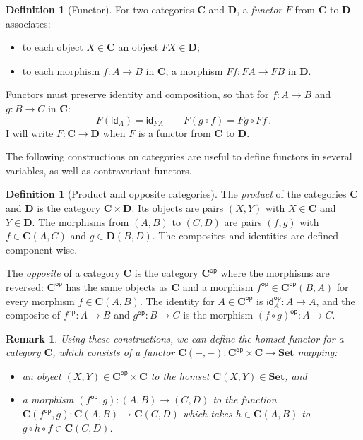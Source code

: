 \documentclass[11pt,oneside]{book}
\newtheorem{remark}[theorem]{Remark}
\theoremstyle{definition}
\newtheorem{definition}[theorem]{Definition}
\newcommand{\kw}[1]{\ensuremath{ \mathsf{#1} }}
\begin{document}
\begin{definition}[Functor] \label{def:functor} %
For two categories $\mathbf{C}$ and $\mathbf{D}$,
a \emph{functor} $F$ from $\mathbf{C}$ to $\mathbf{D}$
associates:
\begin{itemize}
  \item
    to each object $X \in \mathbf{C}$ an object $F X \in \mathbf{D}$;
  \item
    to each morphism $f : A \rightarrow B$ in $\mathbf{C}$,
    a morphism $F f : F A \rightarrow F B$ in $\mathbf{D}$.
\end{itemize}
Functors must preserve identity and composition,
so that for
$f : A \rightarrow B$ and
$g : B \rightarrow C$ in $\mathbf{C}$:
\[
  F (\kw{id}_A) = \kw{id}_{F A}
  \qquad
  F (g \circ f) = F g \circ F f
  \,.
\]
I will write $F : \mathbf{C} \rightarrow \mathbf{D}$
when $F$ is a functor from $\mathbf{C}$ to $\mathbf{D}$.
\end{definition}

The following constructions on categories
are useful to define functors in several variables,
as well as contravariant functors.

\begin{definition}[Product and opposite categories] %
  The \emph{product} of the categories $\mathbf{C}$ and $\mathbf{D}$
  is the category $\mathbf{C} \times \mathbf{D}$.
  Its objects are pairs $(X, Y)$ with $X \in \mathbf{C}$ and $Y \in \mathbf{D}$.
  The morphisms from $(A, B)$ to $(C, D)$
  are pairs $(f, g)$ with $f \in \mathbf{C}(A, C)$ and $g \in \mathbf{D}(B, D)$.
  The composites and identities are defined component-wise.

  The \emph{opposite} of a category $\mathbf{C}$
  is the category $\mathbf{C}^\kw{op}$
  where the morphisms are reversed:
  $\mathbf{C}^\kw{op}$ has the same objects as $\mathbf{C}$
  and a morphism $f^\kw{op} \in \mathbf{C}^\kw{op}(B, A)$
  for every morphism $f \in \mathbf{C}(A, B)$.
  The identity for $A \in \mathbf{C}^\kw{op}$ is
  $\kw{id}_A^\kw{op} : A \rightarrow A$,
  and the composite of $f^\kw{op} : A \rightarrow B$ and
  $g^\kw{op} : B \rightarrow C$ is
  the morphism $(f \circ g)^\kw{op} : A \rightarrow C$.
\end{definition}

\begin{remark} %
Using these constructions,
we can define the \emph{homset} functor
for a category $\mathbf{C}$,
which consists of a functor
$\mathbf{C}(-, -) :
 \mathbf{C}^\kw{op} \times \mathbf{C} \rightarrow
 \mathbf{Set}$
mapping:
\begin{itemize}
  \item an object $(X, Y) \in \mathbf{C}^\kw{op} \times \mathbf{C}$
    to the homset $\mathbf{C}(X, Y) \in \mathbf{Set}$, and
  \item a morphism $(f^\kw{op}, g) : (A, B) \rightarrow (C, D)$
    to the function
    $\mathbf{C}(f^\kw{op}, g) : \mathbf{C}(A, B) \rightarrow \mathbf{C}(C, D)$
    which takes $h \in \mathbf{C}(A, B)$
    to $g \circ h \circ f \in \mathbf{C}(C, D)$.
\end{itemize}
\end{remark}
\end{document}
